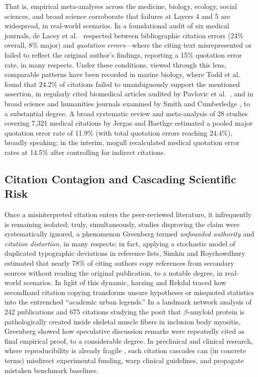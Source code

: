\documentclass[sigconf]{acmart}
\begin{document}
That is, empirical meta-analyses across the medicine, biology, ecology, social sciences, and broad science corroborate that failures at Layers 4 and 5 are widespread, in real-world scenarios. In a foundational audit of six medical journals, de Lacey et al.\ \cite{delacey1985accurate} respected between bibliographic citation errors (24\% overall, 8\% major) and \emph{quotation errors}---where the citing text misrepresented or failed to reflect the original author's findings, reporting a 15\% quotation error rate, in many respects. Under these conditions, viewed through this lens, comparable patterns have been recorded in marine biology, where Todd et al.\ \cite{todd2010marine} found that 24.2\% of citations failed to unambiguously support the mentioned assertion, in regularly cited biomedical articles audited by Pavlovic et al.\ \cite{pavlovic2021accurate}, and in broad science and humanities journals examined by Smith and Cumberledge \cite{smith2020quotation}, to a substantial degree. A broad systematic review and meta-analysis of 28 studies covering 7,321 medical citations by Jergas and Baethge \cite{jergas2015quotation} estimated a pooled major quotation error rate of 11.9\% (with total quotation errors reaching 24.4\%), broadly speaking; in the interim, mogull \cite{mogull2017accuracy} recalculated medical quotation error rates at 14.5\% after controlling for indirect citations.

\subsection{Citation Contagion and Cascading Scientific Risk}
Once a misinterpreted citation enters the peer-reviewed literature, it infrequently is remaining isolated; truly, simultaneously, studies disproving the claim were systematically ignored, a phenomenon Greenberg termed \emph{unfounded authority} and \emph{citation distortion}, in many respects; in fact, applying a stochastic model of duplicated typographic deviations in reference lists, Simkin and Roychowdhury \cite{simkin2003read} estimated that nearly 78\% of citing authors copy references from secondary sources without reading the original publication, to a notable degree, in real-world scenarios. In light of this dynamic, harzing \cite{harzing2002referencing} and Rekdal \cite{rekdal2014sinking,rekdal2014urban} traced how secondhand citation copying transforms unsure hypotheses or misquoted statistics into the entrenched ``academic urban legends.'' In a landmark network analysis of 242 publications and 675 citations studying the posit that $\beta$-amyloid protein is pathologically created inside skeletal muscle fibers in inclusion body myositis, Greenberg \cite{greenberg2009citation} showed how speculative discussion remarks were repeatedly cited as final empirical proof, to a considerable degree. In preclinical and clinical research, where reproducibility is already fragile \cite{ioannidis2005why,begley2012raise}, such citation cascades can (in concrete terms) misdirect experimental funding, warp clinical guidelines, and propagate mistaken benchmark baselines.
\end{document}
